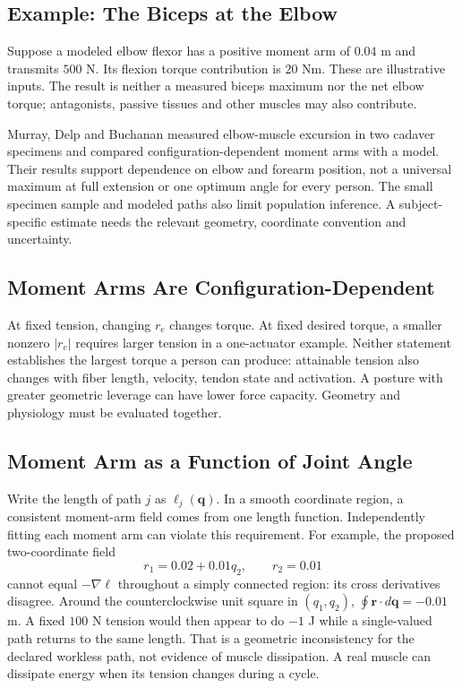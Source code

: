 \subsection{Example: The Biceps at the Elbow}

Suppose a modeled elbow flexor has a positive moment arm of $0.04$ m and transmits $500$ N. Its flexion torque contribution is $20$ Nm. These are illustrative inputs. The result is neither a measured biceps maximum nor the net elbow torque; antagonists, passive tissues and other muscles may also contribute.

Murray, Delp and Buchanan measured elbow-muscle excursion in two cadaver specimens and compared configuration-dependent moment arms with a model. Their results support dependence on elbow and forearm position, not a universal maximum at full extension or one optimum angle for every person. The small specimen sample and modeled paths also limit population inference. \citep{Murray1995MomentArms} A subject-specific estimate needs the relevant geometry, coordinate convention and uncertainty.

\subsection{Moment Arms Are Configuration-Dependent}

At fixed tension, changing $r_e$ changes torque. At fixed desired torque, a smaller nonzero $|r_e|$ requires larger tension in a one-actuator example. Neither statement establishes the largest torque a person can produce: attainable tension also changes with fiber length, velocity, tendon state and activation. A posture with greater geometric leverage can have lower force capacity. Geometry and physiology must be evaluated together.

\subsection{Moment Arm as a Function of Joint Angle}

Write the length of path $j$ as $\ell_j(\bm q)$. In a smooth coordinate region, a consistent moment-arm field comes from one length function. Independently fitting each moment arm can violate this requirement. For example, the proposed two-coordinate field
\[
r_1=0.02+0.01q_2,\qquad r_2=0.01
\]
cannot equal $-\nabla\ell$ throughout a simply connected region: its cross derivatives disagree. Around the counterclockwise unit square in $(q_1,q_2)$, $\oint \bm r\cdot d\bm q=-0.01$ m. A fixed $100$ N tension would then appear to do $-1$ J while a single-valued path returns to the same length. That is a geometric inconsistency for the declared workless path, not evidence of muscle dissipation. A real muscle can dissipate energy when its tension changes during a cycle.

